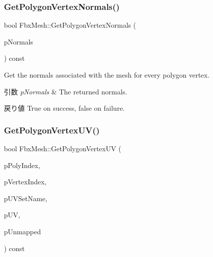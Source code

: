 \subsubsection{\texorpdfstring{Get\+Polygon\+Vertex\+Normals()}{GetPolygonVertexNormals()}}
{\footnotesize\ttfamily bool Fbx\+Mesh\+::\+Get\+Polygon\+Vertex\+Normals (\begin{DoxyParamCaption}\item[{\hyperlink{class_fbx_array}{Fbx\+Array}$<$ \hyperlink{class_fbx_vector4}{Fbx\+Vector4} $>$ \&}]{p\+Normals }\end{DoxyParamCaption}) const}

Get the normals associated with the mesh for every polygon vertex. 
\begin{DoxyParams}{引数}
{\em p\+Normals} & The returned normals. \\
\hline
\end{DoxyParams}
\begin{DoxyReturn}{戻り値}
{\ttfamily True} on success, {\ttfamily false} on failure. 
\end{DoxyReturn}
\mbox{\label{class_fbx_mesh_ab620226c1d138f01121c7bdc16945d92}} 
\subsubsection{\texorpdfstring{Get\+Polygon\+Vertex\+U\+V()}{GetPolygonVertexUV()}}
{\footnotesize\ttfamily bool Fbx\+Mesh\+::\+Get\+Polygon\+Vertex\+UV (\begin{DoxyParamCaption}\item[{int}]{p\+Poly\+Index,  }\item[{int}]{p\+Vertex\+Index,  }\item[{const char $\ast$}]{p\+U\+V\+Set\+Name,  }\item[{\hyperlink{class_fbx_vector2}{Fbx\+Vector2} \&}]{p\+UV,  }\item[{bool \&}]{p\+Unmapped }\end{DoxyParamCaption}) const}

